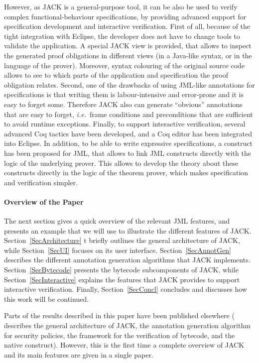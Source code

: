 However, as JACK is a general-purpose tool, it can be also be used to
verify complex functional-behaviour specifications, by providing
advanced support for specification development and interactive
verification. First of all, because of the tight integration with
Eclipse, the developer does not have to change tools to validate the
application. A special JACK view is provided, that allows to inspect
the generated proof obligations in different views (in a Java-like
syntax, or in the language of the prover). Moreover, syntax colouring
of the original source code allows to see to which parts of the
application and specification the proof obligation relates. Second,
one of the drawbacks of using JML-like annotations for specifications
is that writing them is labour-intensive and error-prone and it is
easy to forget some. Therefore JACK also can generate ``obvious''
annotations that are easy to forget, \emph{i.e.}\ frame conditions and
preconditions that are sufficient to avoid runtime
exceptions. Finally, to support interactive verification, several
advanced Coq tactics have been developed, and a Coq editor has been
integrated into Eclipse. In addition, to be able to write expressive
specifications, a
\native construct has been proposed for JML, that allows to
link JML constructs directly with the logic of the underlying
prover. This allows to develop the theory about these constructs
directly in the logic of the theorem prover, which makes specification
and verification simpler.


\paragraph{Overview of the Paper}
The next section gives a quick overview of the relevant JML features,
and presents an example that we will use to illustrate the different
features of JACK. Section~\ref{SecArchitecture} t briefly outlines the
general architecture of JACK, while Section~\ref{SecUI} focuses on its
user interface. Section~\ref{SecAnnotGen} describes the different
annotation generation algorithms that JACK
implements. Section~\ref{SecBytecode} presents the bytecode
subcomponents of JACK, while Section~\ref{SecInteractive} explains the
features that JACK provides to support interactive
verification. Finally, Section~\ref{SecConcl} concludes and discusses
how this work will be continued.

Parts of the results described in this paper have been published
elsewhere (\cite{BurdyRL03} describes the general architecture of
JACK, \cite{PavlovaBBHL04} the annotation generation algorithm
for security policies, \cite{BP06JSV} the framework for the
verification of bytecode, and \cite{Charles06} the native
construct). However, this is the first time a complete overview of
JACK and its main features are given in a single paper.


